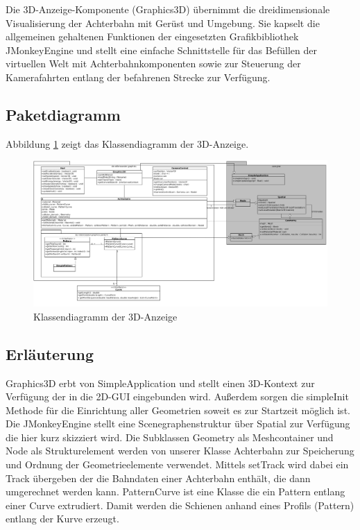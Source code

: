 Die 3D-Anzeige-Komponente (Graphics3D) übernimmt die dreidimensionale Visualisierung der Achterbahn
mit Gerüst und Umgebung. Sie kapselt die allgemeinen gehaltenen Funktionen der eingesetzten
Grafikbibliothek JMonkeyEngine und stellt eine einfache Schnittstelle für das Befüllen 
der virtuellen Welt mit Achterbahnkomponenten sowie zur Steuerung der Kamerafahrten 
entlang der befahrenen Strecke zur Verfügung.

\subsection{Paketdiagramm}
Abbildung \ref{fig:graphics} zeigt das Klassendiagramm der 3D-Anzeige.

\begin{figure}
\includegraphics[width=\linewidth]{bilder/klassendiagramm_006}
\caption{Klassendiagramm der 3D-Anzeige}
\label{fig:graphics}
\end{figure}

\subsection{Erläuterung}

Graphics3D erbt von SimpleApplication und stellt einen 3D-Kontext zur Verfügung der in die 2D-GUI eingebunden wird. Außerdem sorgen die simpleInit Methode für die Einrichtung aller Geometrien soweit es zur Startzeit möglich ist.
Die JMonkeyEngine stellt eine Scenegraphenstruktur über Spatial zur Verfügung die hier kurz skizziert wird. Die Subklassen Geometry als Meshcontainer und Node als Strukturelement werden von unserer Klasse Achterbahn 
zur Speicherung und Ordnung der Geometrieelemente verwendet. Mittels setTrack wird dabei ein Track übergeben der die Bahndaten einer Achterbahn enthält, die dann umgerechnet werden kann. PatternCurve ist eine Klasse die ein Pattern entlang einer Curve extrudiert. 
Damit werden die Schienen anhand eines Profils (Pattern) entlang der Kurve erzeugt. 

